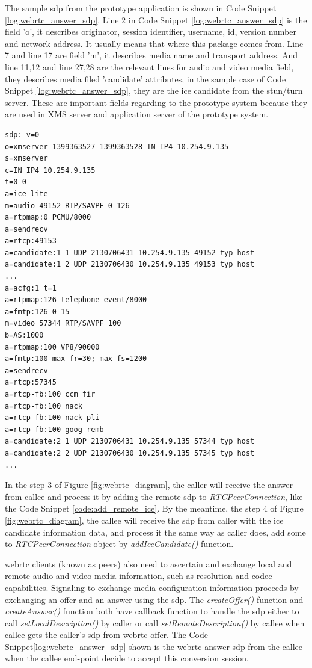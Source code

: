 \par The sample \gls{sdp} from the prototype application is shown in Code Snippet \ref{log:webrtc_answer_sdp}. Line 2 in Code Snippet \ref{log:webrtc_answer_sdp} is the field 'o', it describes originator, session identifier, username, id, version number and network address. It usually means that where this package comes from. Line 7 and line 17 are field 'm', it describes media name and transport address. And line 11,12 and line 27,28 are the relevant lines for audio and video media field, they describes media filed 'candidate' attributes, in the sample case of Code Snippet \ref{log:webrtc_answer_sdp}, they are the \gls{ice} candidate from the \gls{stun}/\gls{turn} server. These are important fields regarding to the prototype system because they are used in XMS server and application server of the prototype system.

\begin{lstlisting}[caption={Sample \gls{webrtc} Answer \gls{sdp}},label={log:webrtc_answer_sdp}]
sdp: v=0
o=xmserver 1399363527 1399363528 IN IP4 10.254.9.135
s=xmserver
c=IN IP4 10.254.9.135
t=0 0
a=ice-lite
m=audio 49152 RTP/SAVPF 0 126
a=rtpmap:0 PCMU/8000
a=sendrecv
a=rtcp:49153
a=candidate:1 1 UDP 2130706431 10.254.9.135 49152 typ host
a=candidate:1 2 UDP 2130706430 10.254.9.135 49153 typ host
...
a=acfg:1 t=1
a=rtpmap:126 telephone-event/8000
a=fmtp:126 0-15
m=video 57344 RTP/SAVPF 100
b=AS:1000
a=rtpmap:100 VP8/90000
a=fmtp:100 max-fr=30; max-fs=1200
a=sendrecv
a=rtcp:57345
a=rtcp-fb:100 ccm fir
a=rtcp-fb:100 nack
a=rtcp-fb:100 nack pli
a=rtcp-fb:100 goog-remb
a=candidate:2 1 UDP 2130706431 10.254.9.135 57344 typ host
a=candidate:2 2 UDP 2130706430 10.254.9.135 57345 typ host
...
\end{lstlisting}

\par In the step 3 of Figure \ref{fig:webrtc_diagram}, the caller will receive the answer from callee and process it by adding the remote \gls{sdp} to \textit{RTCPeerConnection}, like the Code Snippet \ref{code:add_remote_ice}. By the meantime, the step 4 of Figure \ref{fig:webrtc_diagram}, the callee will receive the \gls{sdp} from caller with the \gls{ice} candidate information data, and process it the same way as caller does, add some to \textit{RTCPeerConnection} object by \textit{addIceCandidate()} function.

\par \gls{webrtc} clients (known as peers) also need to ascertain and exchange local and remote audio and video media information, such as resolution and codec capabilities. Signaling to exchange media configuration information proceeds by exchanging an offer and an answer using the \gls{sdp}. The \textit{createOffer()} function and \textit{createAnswer()} function both have callback function to handle the \gls{sdp} either to call \textit{setLocalDescription()} by caller or call \textit{setRemoteDescription()} by callee when callee gets the caller's \gls{sdp} from \gls{webrtc} offer. The Code Snippet\ref{log:webrtc_answer_sdp} shown is the \gls{webrtc} answer \gls{sdp} from the callee when the callee end-point decide to accept this conversion session.

